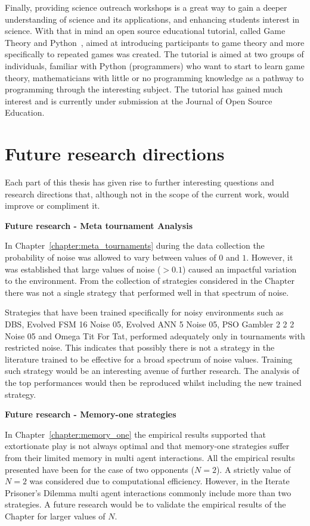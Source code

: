 Finally, providing science outreach workshops is a great way to gain a deeper
understanding of science and its applications, and enhancing students interest
in science. With that in mind an open source educational tutorial, called Game
Theory and Python~\cite{Glynatsi2017_game}, aimed at introducing participants to
game theory and more specifically to repeated games was created. The tutorial is
aimed at two groups of individuals, familiar with Python (programmers) who want
to start to learn game theory, mathematicians with little or no programming
knowledge as a pathway to programming through the interesting subject. The
tutorial has gained much interest and is currently under submission at the
Journal of Open Source Education.

\section{Future research directions}

Each part of this thesis has given rise to further interesting questions and
research directions that, although not in the scope of the current work, would
improve or compliment it.

\textbf{Future research - Meta tournament Analysis}

In Chapter~\ref{chapter:meta_tournaments} during the data collection the
probability of noise was allowed to vary between values of \(0\) and \(1\).
However, it was established that large values of noise (\(>
0.1\)) caused an impactful variation to the environment. From the collection of
\numberofstrategies strategies considered in the Chapter there was not a single
strategy that performed well in that spectrum of noise.

Strategies that have been trained specifically for noisy environments such
as DBS, Evolved FSM 16 Noise 05, Evolved ANN 5 Noise 05, PSO Gambler 2 2 2 Noise 05
and Omega Tit For Tat, performed adequately only in tournaments with restricted
noise. This indicates that possibly there is not a strategy in the literature
trained to be effective for a broad spectrum of noise values. Training such
strategy would be an interesting avenue of further research. The analysis of the
top performances would then be reproduced whilst including the new trained strategy.

\textbf{Future research - Memory-one strategies}

In Chapter~\ref{chapter:memory_one} the empirical results supported that
extortionate play is not always optimal and that memory-one strategies suffer
from their limited memory in multi agent interactions. All the empirical results
presented have been for the case of two opponents (\(N=2\)). A strictly value of \(N=2\) was
considered due to computational efficiency. However, in the Iterate Prisoner's
Dilemma multi agent interactions commonly include more than two strategies. A
future research would be to validate the empirical results of the Chapter for
larger values of \(N\).

